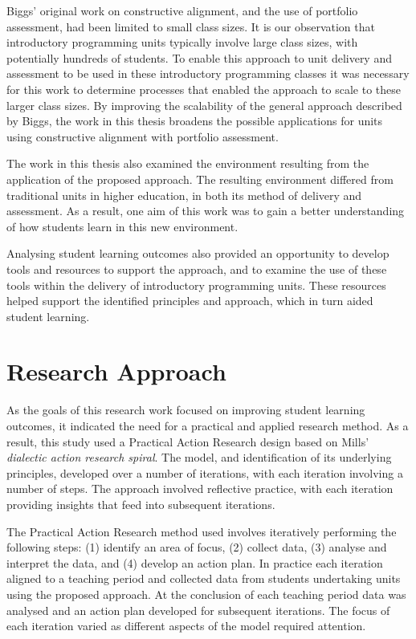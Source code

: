 Biggs' original work on constructive alignment, and the use of portfolio assessment, had been limited to small class sizes. It is our observation that introductory programming units typically involve large class sizes, with potentially hundreds of students. To enable this approach to unit delivery and assessment to be used in these introductory programming classes it was necessary for this work to determine processes that enabled the approach to scale to these larger class sizes. By improving the scalability of the general approach described by Biggs, the work in this thesis broadens the possible applications for units using constructive alignment with portfolio assessment.

The work in this thesis also examined the environment resulting from the application of the proposed approach. The resulting environment differed from traditional units in higher education, in both its method of delivery and assessment. As a result, one aim of this work was to gain a better understanding of how students learn in this new environment.

Analysing student learning outcomes also provided an opportunity to develop tools and resources to support the approach, and to examine the use of these tools within the delivery of introductory programming units. These resources helped support the identified principles and approach, which in turn aided student learning.



\section{Research Approach} %
\label{sec:research_approach}

As the goals of this research work focused on improving student learning outcomes, it indicated the need for a practical and applied research method. As a result, this study used a Practical Action Research \cite{Creswell:2008} design based on Mills' \cite{Mills:2010} \emph{dialectic action research spiral}. The model, and identification of its underlying principles, developed over a number of iterations, with each iteration involving a number of steps. The approach involved reflective practice, with each iteration providing insights that feed into subsequent iterations.

The Practical Action Research method used involves iteratively performing the following steps: (1) identify an area of focus, (2) collect data, (3) analyse and interpret the data, and (4) develop an action plan. In practice each iteration aligned to a teaching period and collected data from students undertaking units using the proposed approach. At the conclusion of each teaching period data was analysed and an action plan developed for subsequent iterations. The focus of each iteration varied as different aspects of the model required attention.

